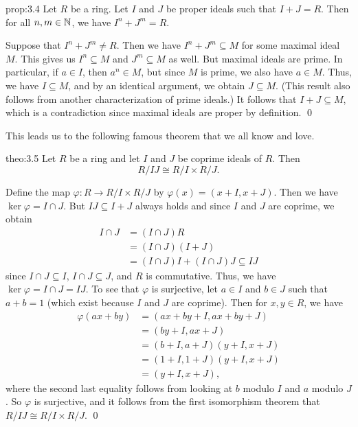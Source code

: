 \begin{prop}{prop:3.4}
    Let $R$ be a ring. Let $I$ and $J$ be proper ideals such that $I + J = R$. 
    Then for all $n, m \in \mathbb{N}$, we have $I^n + J^m = R$. 
\end{prop}\vspace{-0.25cm}
\begin{pf}
    Suppose that $I^n + J^m \neq R$. Then we have $I^n + J^m \subseteq M$ 
    for some maximal ideal $M$. This gives us $I^n \subseteq M$ and 
    $J^m \subseteq M$ as well. But maximal ideals are prime. 
    In particular, if $a \in I$, then $a^n \in M$, but since $M$ is 
    prime, we also have $a \in M$. Thus, we have $I \subseteq M$, 
    and by an identical argument, we obtain $J \subseteq M$. (This result 
    also follows from another characterization of prime ideals.)
    It follows that $I + J \subseteq M$, which is a contradiction since 
    maximal ideals are proper by definition. \qed 
\end{pf}\vspace{-0.25cm}

This leads us to the following famous theorem that we all know and love. 

\begin{theo}{theo:3.5}
    Let $R$ be a ring and let $I$ and $J$ be coprime ideals of $R$. Then 
    \[ R/IJ \cong R/I \times R/J. \]
\end{theo}\vspace{-0.25cm}
\newpage
\begin{pf}
    Define the map $\varphi : R \to R/I \times R/J$ by $\varphi(x) 
    = (x+I, x+J)$. Then we have $\ker\varphi = I \cap J$. But $IJ 
    \subseteq I+J$ always holds and since $I$ and $J$ are coprime, we obtain 
    \begin{align*}
        I \cap J &= (I \cap J)R \\ 
        &= (I \cap J)(I + J) \\ 
        &= (I \cap J)I + (I \cap J)J \subseteq IJ
    \end{align*}
    since $I \cap J \subseteq I$, $I \cap J \subseteq J$, and $R$ is 
    commutative. Thus, we have $\ker\varphi = I \cap J = IJ$. To see that 
    $\varphi$ is surjective, let $a \in I$ and $b \in J$ such that $a + b = 1$
    (which exist because $I$ and $J$ are coprime). Then for $x, y \in R$, we have 
    \begin{align*}
        \varphi(ax + by) &= (ax + by + I, ax + by + J) \\ 
        &= (by + I, ax + J) \\ 
        &= (b + I, a + J)(y + I, x + J) \\ 
        &= (1 + I, 1 + J)(y + I, x + J) \\ 
        &= (y + I, x + J),
    \end{align*}
    where the second last equality follows from looking at $b$ modulo $I$ 
    and $a$ modulo $J$. So $\varphi$ is surjective, and it follows from 
    the first isomorphism theorem that $R/IJ \cong R/I \times R/J$. \qed
\end{pf}\vspace{-0.25cm}

